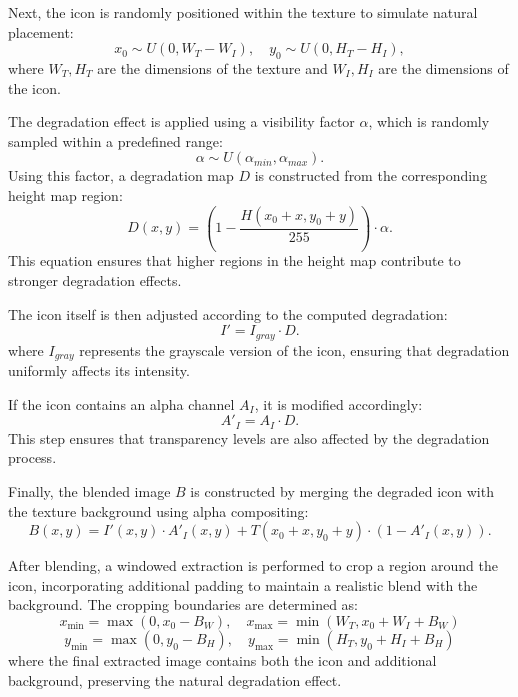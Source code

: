 Next, the icon is randomly positioned within the texture to simulate natural placement:
\begin{equation}
    x_0 \sim U(0, W_T - W_I), \quad y_0 \sim U(0, H_T - H_I),
\end{equation}
where $W_T, H_T$ are the dimensions of the texture and $W_I, H_I$ are the dimensions of the icon.

The degradation effect is applied using a visibility factor $\alpha$, which is randomly sampled within a predefined range:
\begin{equation}
    \alpha \sim U(\alpha_{min}, \alpha_{max}).
\end{equation}
Using this factor, a degradation map $D$ is constructed from the corresponding height map region:
\begin{equation}
    D(x, y) = \left(1 - \frac{H(x_0 + x, y_0 + y)}{255}\right) \cdot \alpha.
\end{equation}
This equation ensures that higher regions in the height map contribute to stronger degradation effects.

The icon itself is then adjusted according to the computed degradation:
\begin{equation}
    I' = I_{gray} \cdot D.
\end{equation}
where $I_{gray}$ represents the grayscale version of the icon, ensuring that degradation uniformly affects its intensity.

If the icon contains an alpha channel $A_I$, it is modified accordingly:
\begin{equation}
    A'_I = A_I \cdot D.
\end{equation}
This step ensures that transparency levels are also affected by the degradation process.

Finally, the blended image $B$ is constructed by merging the degraded icon with the texture background using alpha compositing:
\begin{equation}
    B(x, y) = I'(x, y) \cdot A'_I(x, y) + T(x_0 + x, y_0 + y) \cdot (1 - A'_I(x, y)).
\end{equation}


After blending, a windowed extraction is performed to crop a region around the icon, incorporating additional padding to maintain a realistic blend with the background. The cropping boundaries are determined as:
\begin{equation}
    x_{\min} = \max(0, x_0 - B_W), \quad x_{\max} = \min(W_T, x_0 + W_I + B_W)
\end{equation}
\begin{equation}
    y_{\min} = \max(0, y_0 - B_H), \quad y_{\max} = \min(H_T, y_0 + H_I + B_H)
\end{equation}
where the final extracted image contains both the icon and additional background, preserving the natural degradation effect.

